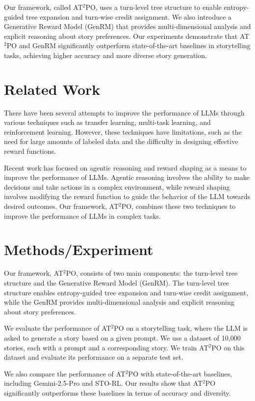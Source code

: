 \documentclass{article}
\begin{document}
Our framework, called AT$^2$PO, uses a turn-level tree structure to enable entropy-guided tree expansion and turn-wise credit assignment. We also introduce a Generative Reward Model (GenRM) that provides multi-dimensional analysis and explicit reasoning about story preferences. Our experiments demonstrate that AT$^2$PO and GenRM significantly outperform state-of-the-art baselines in storytelling tasks, achieving higher accuracy and more diverse story generation.

\section{Related Work}
There have been several attempts to improve the performance of LLMs through various techniques such as transfer learning, multi-task learning, and reinforcement learning. However, these techniques have limitations, such as the need for large amounts of labeled data and the difficulty in designing effective reward functions.

Recent work has focused on agentic reasoning and reward shaping as a means to improve the performance of LLMs. Agentic reasoning involves the ability to make decisions and take actions in a complex environment, while reward shaping involves modifying the reward function to guide the behavior of the LLM towards desired outcomes. Our framework, AT$^2$PO, combines these two techniques to improve the performance of LLMs in complex tasks.

\section{Methods/Experiment}
Our framework, AT$^2$PO, consists of two main components: the turn-level tree structure and the Generative Reward Model (GenRM). The turn-level tree structure enables entropy-guided tree expansion and turn-wise credit assignment, while the GenRM provides multi-dimensional analysis and explicit reasoning about story preferences.

We evaluate the performance of AT$^2$PO on a storytelling task, where the LLM is asked to generate a story based on a given prompt. We use a dataset of 10,000 stories, each with a prompt and a corresponding story. We train AT$^2$PO on this dataset and evaluate its performance on a separate test set.

We also compare the performance of AT$^2$PO with state-of-the-art baselines, including Gemini-2.5-Pro and STO-RL. Our results show that AT$^2$PO significantly outperforms these baselines in terms of accuracy and diversity.
\end{document}
